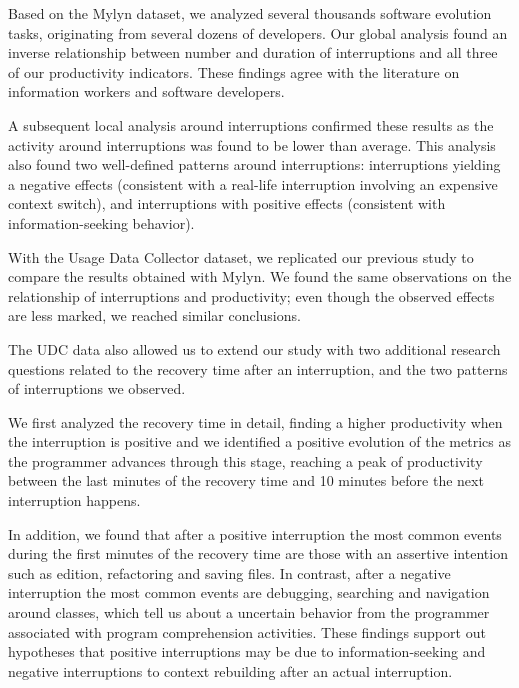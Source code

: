 \documentclass[times]{smrauth}
\begin{document}
Based on the Mylyn dataset, we analyzed several thousands software evolution tasks, originating from several dozens of developers. Our global analysis found an inverse relationship between number and duration of interruptions and all three of our productivity indicators. These findings agree with the literature on information workers and software developers. 

A subsequent local analysis around interruptions confirmed these results as the activity around interruptions was found to be lower than average. This analysis also found two well-defined patterns around interruptions: interruptions yielding a negative effects (consistent with a real-life interruption involving an expensive context switch), and interruptions with positive effects (consistent with information-seeking behavior). %

With the Usage Data Collector dataset, we replicated our previous study to compare the results obtained with Mylyn. We found the same observations on the relationship of interruptions and productivity; even though the observed effects are less marked, we reached similar conclusions.

The UDC data also allowed us to extend our study with two additional research questions related to the recovery time after an interruption, and the two patterns of interruptions we observed. 

We first analyzed the recovery time in detail, finding a higher productivity when the interruption is positive and we identified a positive evolution of the metrics as the programmer advances through this stage, reaching a peak of productivity between the last minutes of the recovery time and 10 minutes before the next interruption happens.  

In addition, we found that after a positive interruption the most common events during the first minutes of the recovery time are those with an assertive intention such as edition, refactoring and saving files. In contrast, after a negative interruption the most common events are debugging, searching and navigation around classes, which tell us about a uncertain behavior from the programmer associated with program comprehension activities. These findings support out hypotheses that positive interruptions may be due to information-seeking and negative interruptions to context rebuilding after an actual interruption.






\end{document}
